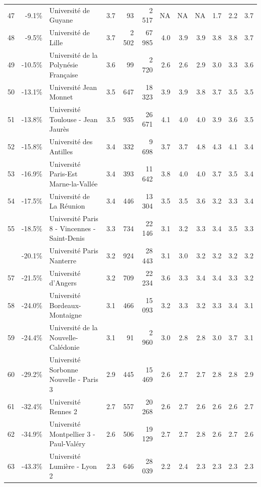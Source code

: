 \documentclass[12pt,french,landscape]{article}
\begin{document}
\begin{longtable}{rrlrrrrrrlrr}
\rowcolor{gray!6}  47 & -9.1\% & Université de Guyane & 3.7 & 93 & 2 517 & NA & NA & NA & 1.7 & 2.2 & 3.7\\
48 & -9.5\% & Université de Lille & 3.7 & 2 502 & 67 985 & 4.0 & 3.9 & 3.9 & 3.8 & 3.8 & 3.7\\
\rowcolor{gray!6}  49 & -10.5\% & Université de la Polynésie Française & 3.6 & 99 & 2 720 & 2.6 & 2.6 & 2.9 & 3.0 & 3.3 & 3.6\\
50 & -13.1\% & Université Jean Monnet & 3.5 & 647 & 18 323 & 3.9 & 3.9 & 3.8 & 3.7 & 3.5 & 3.5\\
\addlinespace
\rowcolor{gray!6}  51 & -13.8\% & Université Toulouse - Jean Jaurès & 3.5 & 935 & 26 671 & 4.1 & 4.0 & 4.0 & 3.9 & 3.6 & 3.5\\
52 & -15.8\% & Université des Antilles & 3.4 & 332 & 9 698 & 3.7 & 3.7 & 4.8 & 4.3 & 4.1 & 3.4\\
\rowcolor{gray!6}  53 & -16.9\% & Université Paris-Est Marne-la-Vallée & 3.4 & 393 & 11 642 & 3.8 & 4.0 & 4.0 & 3.7 & 3.5 & 3.4\\
54 & -17.5\% & Université de La Réunion & 3.4 & 446 & 13 304 & 3.5 & 3.5 & 3.6 & 3.2 & 3.3 & 3.4\\
\rowcolor{gray!6}  55 & -18.5\% & Université Paris 8 - Vincennes - Saint-Denis & 3.3 & 734 & 22 146 & 3.1 & 3.2 & 3.3 & 3.4 & 3.5 & 3.3\\
\addlinespace
56 & -20.1\% & Université Paris Nanterre & 3.2 & 924 & 28 443 & 3.1 & 3.0 & 3.2 & 3.2 & 3.2 & 3.2\\
\rowcolor{gray!6}  57 & -21.5\% & Université d'Angers & 3.2 & 709 & 22 234 & 3.6 & 3.3 & 3.4 & 3.4 & 3.3 & 3.2\\
58 & -24.0\% & Université Bordeaux-Montaigne & 3.1 & 466 & 15 093 & 3.2 & 3.3 & 3.2 & 3.3 & 3.4 & 3.1\\
\rowcolor{gray!6}  59 & -24.4\% & Université de la Nouvelle-Calédonie & 3.1 & 91 & 2 960 & 3.0 & 2.8 & 2.8 & 3.0 & 3.7 & 3.1\\
60 & -29.2\% & Université Sorbonne Nouvelle - Paris 3 & 2.9 & 445 & 15 469 & 2.6 & 2.7 & 2.7 & 2.8 & 2.8 & 2.9\\
\addlinespace
\rowcolor{gray!6}  61 & -32.4\% & Université Rennes 2 & 2.7 & 557 & 20 268 & 2.6 & 2.7 & 2.6 & 2.6 & 2.6 & 2.7\\
62 & -34.9\% & Université Montpellier 3 - Paul-Valéry & 2.6 & 506 & 19 129 & 2.7 & 2.7 & 2.8 & 2.6 & 2.7 & 2.6\\
\rowcolor{gray!6}  63 & -43.3\% & Université Lumière - Lyon 2 & 2.3 & 646 & 28 039 & 2.2 & 2.4 & 2.3 & 2.3 & 2.3 & 2.3\\

\end{longtable}
\end{document}
